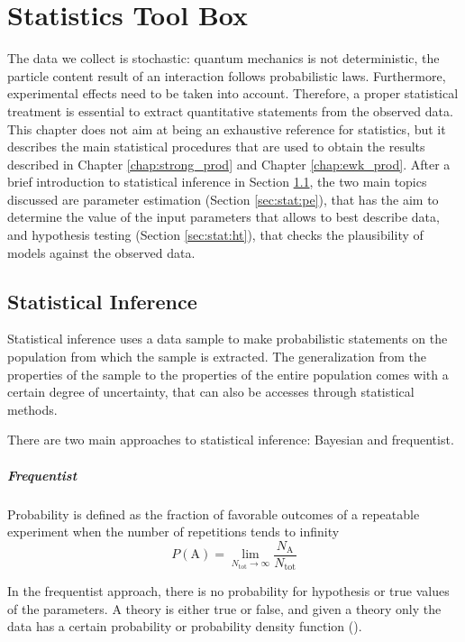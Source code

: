 \chapter{Statistics Tool Box}
\label{chap:stat}

The data we collect is stochastic: quantum mechanics is not deterministic, the particle content result of an interaction follows probabilistic laws. Furthermore, experimental effects need to be taken into account. Therefore, a proper statistical treatment is essential to extract quantitative statements from the observed data. This chapter does not aim at being an exhaustive reference for statistics, but it describes the main statistical procedures that are used to obtain the results described in Chapter \ref{chap:strong_prod} and Chapter \ref{chap:ewk_prod}. After a brief introduction to statistical inference in Section \ref{sec:stat:intro}, the two main topics discussed are parameter estimation (Section \ref{sec:stat:pe}), that has the aim to determine the value of the input parameters that allows to best describe data, and hypothesis testing (Section \ref{sec:stat:ht}), that checks the plausibility of models against the observed data. 
\section{Statistical Inference}
\label{sec:stat:intro}

Statistical inference uses a data sample to make probabilistic statements on the population from which the sample is extracted. The generalization from the properties of the sample to the properties of the entire population comes with a certain degree of uncertainty, that can also be accesses through statistical methods.

There are two main approaches to statistical inference: Bayesian and frequentist.

\paragraph{Frequentist}

Probability is defined as the fraction of favorable outcomes of a repeatable experiment when the number of repetitions tends to infinity 
\begin{equation}
P(\mathrm{A}) = \lim_{N_{\mathrm{tot}} \rightarrow \infty} \frac{N_\mathrm{A}}{N_{\mathrm{tot}}}
\end{equation}

In the frequentist approach, there is no probability for hypothesis or true values of the parameters. A theory is either true or false, and given a theory only the data has a certain probability or probability density function (\pdf).

